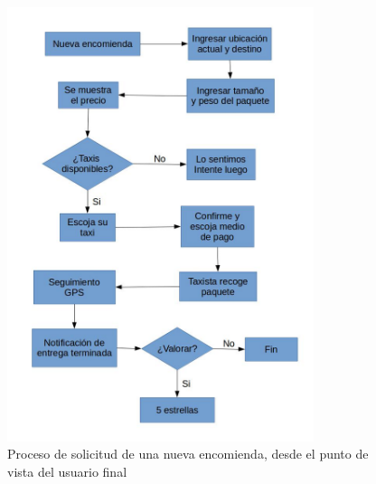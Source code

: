 \begin{figure}[htb]
\centering
\includegraphics[width=0.8\textwidth]{./img/nueva_encomienda.jpg}
\caption{Proceso de solicitud de una nueva encomienda, desde el punto de vista del usuario final} \label{fig:proc_nueva_encomienda}
\end{figure}



